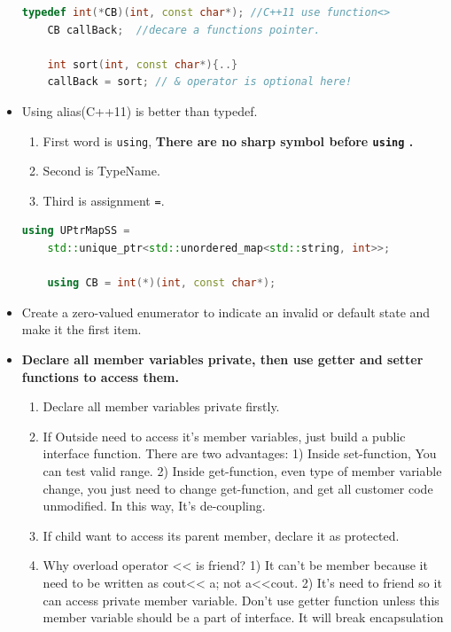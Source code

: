 \documentclass[a4paper,12pt,twoside]{book}
\begin{document}
\begin{itemize}
\begin{lstlisting}[frame=single, language=c++]
	typedef int(*CB)(int, const char*); //C++11 use function<>
	CB callBack;  //decare a functions pointer.
	
	int sort(int, const char*){..}
	callBack = sort; // & operator is optional here!
	\end{lstlisting}
	
	\item Using alias(C++11) is better than typedef. 
	\begin{enumerate}
		\item First word is \texttt{using}, \textbf{There are no sharp symbol before \texttt{using} .} 
		\item Second is TypeName. 
		\item Third is assignment \texttt{=}.  
	\end{enumerate}
	
	\begin{lstlisting}[frame=single, language=c++]
	using UPtrMapSS =
	std::unique_ptr<std::unordered_map<std::string, int>>;
	
	using CB = int(*)(int, const char*);
	\end{lstlisting}
	
	\item Create a zero-valued enumerator to indicate an invalid or default state and make it the first item.
	
	\item \textbf{Declare all member variables private, then use getter and setter functions to access them.}
	\begin{enumerate}
		\item Declare all member variables private firstly.
		
		\item If Outside need to access it's member variables, just build a public interface function. There are two advantages: 1) Inside set-function, You can test valid range. 2) Inside get-function, even type of member variable change, you just need to change get-function, and get all customer code unmodified. In this way, It's de-coupling.
		
		\item If child want to access its parent member, declare it as protected.
		
		\item Why overload operator << is friend? 1) It can't be member because it need to be written as cout<< a; not a<<cout. 2) It's need to friend so it can access private member variable. Don't use getter function unless this member variable should be a part of interface. It will break encapsulation 
	\end{enumerate}
	

\end{itemize}
\end{document}
